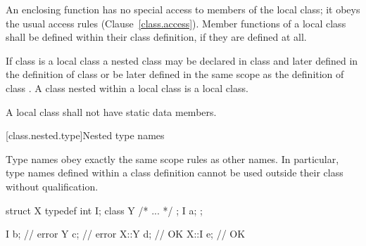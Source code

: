 \pnum
An enclosing function has no special access to members of the local
class; it obeys the usual access rules (Clause~\ref{class.access}).
%
Member functions of a local class shall be defined within their class
definition, if they are defined at all.

\pnum
{}%
If class  is a local class a nested class  may be
declared in class  and later defined in the definition of class
 or be later defined in the same scope as the definition of
class .
%
A class nested within
a local class is a local class.

\pnum
A local class shall not have static data members.

[class.nested.type]{Nested type names}
%
%

\pnum
Type names obey exactly the same scope rules as other names. In
particular, type names defined within a class definition cannot be used
outside their class without qualification.
\enterexample

%
\begin{codeblock}
struct X {
  typedef int I;
  class Y { /* ... */ };
  I a;
};

I b;                            // error
Y c;                            // error
X::Y d;                         // OK
X::I e;                         // OK
\end{codeblock}
\exitexample%
